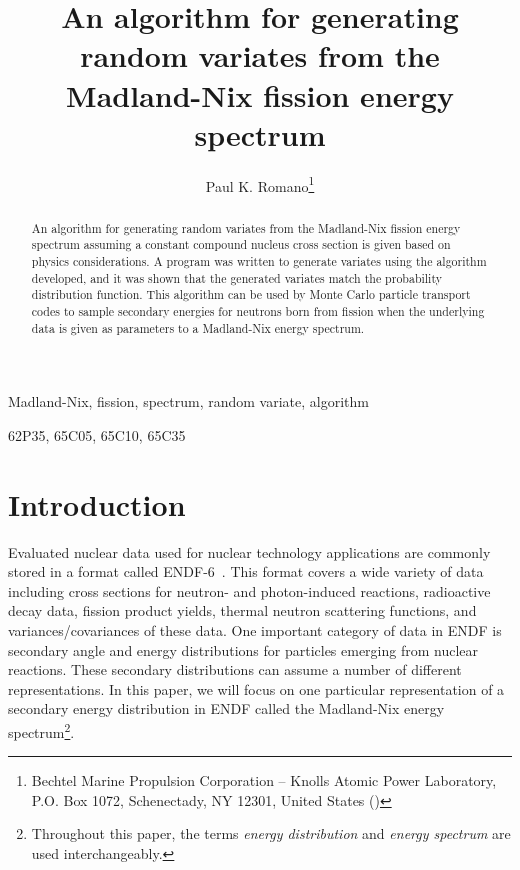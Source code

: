 \documentclass[final,leqno,onefignum,onetabnum]{siamltex1213}
\title{An algorithm for generating random variates from the Madland-Nix fission
  energy spectrum}
\author{Paul K. Romano\thanks{Bechtel Marine Propulsion Corporation -- Knolls
    Atomic Power Laboratory, P.O. Box 1072, Schenectady, NY 12301, United
    States (\email{paul.romano@unnpp.gov})}}
\begin{document}
\maketitle

\begin{abstract}
  An algorithm for generating random variates from the Madland-Nix fission
  energy spectrum assuming a constant compound nucleus cross section is given
  based on physics considerations. A program was written to generate variates
  using the algorithm developed, and it was shown that the generated variates
  match the probability distribution function. This algorithm can be used by
  Monte Carlo particle transport codes to sample secondary energies for neutrons
  born from fission when the underlying data is given as parameters to a
  Madland-Nix energy spectrum.
\end{abstract}

\begin{keywords}
  Madland-Nix, fission, spectrum, random variate, algorithm
\end{keywords}

\begin{AMS}62P35, 65C05, 65C10, 65C35\end{AMS}

\pagestyle{myheadings}
\thispagestyle{plain}

\section{Introduction}

Evaluated nuclear data used for nuclear technology applications are commonly
stored in a format called ENDF-6~\cite{bnl-trkov-2012}. This format covers a
wide variety of data including cross sections for neutron- and photon-induced
reactions, radioactive decay data, fission product yields, thermal neutron
scattering functions, and variances/covariances of these data. One important
category of data in ENDF is secondary angle and energy distributions for
particles emerging from nuclear reactions. These secondary distributions can
assume a number of different representations. In this paper, we will focus on
one particular representation of a secondary energy distribution in ENDF called
the Madland-Nix energy spectrum\footnote{Throughout this paper, the terms
  \textit{energy distribution} and \textit{energy spectrum} are used
  interchangeably.}.
\end{document}
